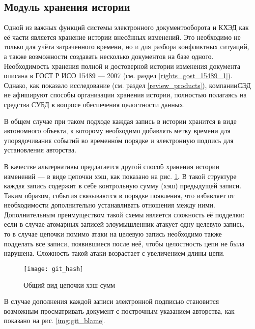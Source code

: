 \subsection{Модуль хранения истории} \label{research_history}

Одной из важных функций системы электронного документооборота и КХЭД как её части является хранение истории внесённых изменений. Это необходимо не только для учёта затраченного времени, но и для разбора конфликтных ситуаций, а также возможности создавать несколько документов на базе одного. Необходимость хранения полной и достоверной истории изменения документа описана в ГОСТ Р ИСО 15489 --- 2007 (см. раздел \ref{rights_gost_15489_1}). Однако, как показало исследование (см. раздел \ref{review_products}), компании СЭД не афишируют способы организации хранения истории, полностью полагаясь на средства СУБД в вопросе обеспечения целостности данных.

\vspace{\baselineskip}
В общем случае при таком подходе каждая запись в истории хранится в виде автономного объекта, к которому необходимо добавлять метку времени для упорядочивания событий во временн\'{о}м порядке и электронную подпись для установления авторства.

\vspace{\baselineskip}
В качестве альтернативы предлагается другой способ хранения истории изменений --- в виде цепочки хэш, как показано на рис. \ref{img:git_hash}. В такой структуре каждая запись содержит в себе контрольную сумму (хэш) предыдущей записи. Таким образом, события связываются в порядке появления, что избавляет от необходимости дополнительно устанавливать отношения между ними. Дополнительным преимуществом такой схемы является сложность её подделки: если в случае атомарных записей злоумышленник атакует одну целевую запись, то в случае цепочки помимо атаки на целевую запись необходимо также подделать все записи, появившиеся после неё, чтобы целостность цепи не была нарушена. Сложность такой атаки возрастает с увеличением длины цепи.
\begin{figure}[h!]
  \centering
  \texttt{[image: git\_hash]}
  \caption{Общий вид цепочки хэш-сумм}
  \label{img:git_hash}
\end{figure}

\vspace{\baselineskip}
В случае дополнения каждой записи электронной подписью становится возможным просматривать документ с построчным указанием авторства, как показано на рис. \ref{img:git_blame}.

